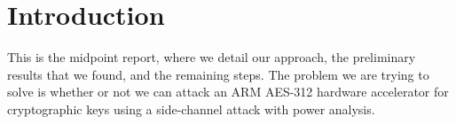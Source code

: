 \section{Introduction}
\label{sec:introduction}

This is the midpoint report, where we detail our approach, the preliminary results that we found, and the remaining steps. The problem we are trying to solve is whether or not we can attack an ARM AES-312 hardware accelerator for cryptographic keys using a side-channel attack with power analysis. 
